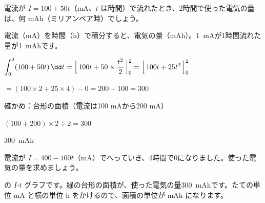\begin{reidai}
電流が $I=100+50t$（mA、$t$ は時間）で流れたとき、2時間で使った電気の量は、何 mAh（ミリアンペア時）でしょう。\par
\kangaekata 電流（mA）を時間（h）で積分すると、電気の量（mAh）。\qty{1}{mA}が1時間流れた量が\qty{1}{mAh}です。\par
\shiki $\displaystyle\int_0^2(100+50t)\,\dd t=\Bigl[\,100t+50\times\frac{t^2}{2}\,\Bigr]_0^2=\Bigl[\,100t+25t^2\,\Bigr]_0^2$\par
\hspace*{2.6\zw}$=(100\times2+25\times4)-0=200+100=300$\par
\hspace*{2.6\zw}確かめ：台形の面積（電流は100 mAから200 mA）\par
\hspace*{2.6\zw}$(100+200)\times2\div2=300$\par
\kotae \qty{300}{mAh}
\end{reidai}

\begin{jibun}
電流が $I=400-100t$（mA）でへっていき、4時間で0になりました。使った電気の量を求めましょう。
\end{jibun}

\noindent\begin{minipage}[c]{0.46\linewidth}
\end{minipage}\hfill
\begin{minipage}[c]{0.5\linewidth}\raggedright
{}の $I$-$t$ グラフです。緑の台形の面積が、使った電気の量\qty{300}{mAh}です。たての単位 mA と横の単位 h をかけるので、面積の単位が mAh になります。
\end{minipage}

